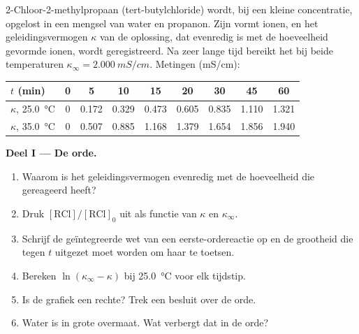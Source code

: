 \begin{problem}
\label{pb:b1:nucleophilic-substitution:1}
2-Chloor-2-methylpropaan (tert-butylchloride) wordt, bij een kleine
concentratie, opgelost in een mengsel van water en propanon. Zijn
  vormt ionen, en het
geleidingsvermogen $\kappa$ van de oplossing, dat evenredig is met de
hoeveelheid gevormde ionen, wordt geregistreerd. Na zeer lange tijd
bereikt het bij beide temperaturen $\kappa_\infty = \qty{2.000}{mS/cm}$.
Metingen (\unit{mS/cm}):

\begin{center}
\begin{tabular}{lcccccccc}
\hline
$t$ (min) & 0 & 5 & 10 & 15 & 20 & 30 & 45 & 60 \\
\hline
$\kappa$, \qty{25.0}{\celsius} & 0 & 0.172 & 0.329 & 0.473 & 0.605 & 0.835 & 1.110 & 1.321 \\
$\kappa$, \qty{35.0}{\celsius} & 0 & 0.507 & 0.885 & 1.168 & 1.379 & 1.654 & 1.856 & 1.940 \\
\hline
\end{tabular}
\end{center}

\medskip
\noindent\textbf{Deel I --- De orde.}
\begin{enumerate}
  \item Waarom is het geleidingsvermogen evenredig met de hoeveelheid
         die gereageerd heeft?
  \item Druk $[\mathrm{RCl}]/[\mathrm{RCl}]_0$ uit als functie van $\kappa$
        en $\kappa_\infty$.
  \item Schrijf de geïntegreerde wet van een eerste-ordereactie op en de
        grootheid die tegen $t$ uitgezet moet worden om haar te toetsen.
  \item Bereken $\ln(\kappa_\infty - \kappa)$ bij \qty{25.0}{\celsius} voor
        elk tijdstip.
  \item Is de grafiek een rechte? Trek een besluit over de orde.
  \item Water is in grote overmaat. Wat verbergt dat in de orde?
\end{enumerate}


\end{problem}

